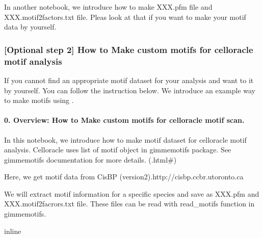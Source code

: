 \documentclass[letterpaper,10pt,english]{sphinxmanual}
\begin{document}
In another notebook, we introduce how to make XXX.pfm file and XXX.motif2factors.txt file. Pleas look at that if you want to make your motif data by yourself.


\subsubsection{{[}Optional step 2{]} How to Make custom motifs for celloracle motif analysis}
\label{\detokenize{tutorials/motifscan:optional-step-2-how-to-make-custom-motifs-for-celloracle-motif-analysis}}
If you cannot find an appropriate motif dataset for your analysis and want to it by yourself. You can follow the instruction below.
We introduce an example way to make motifs using  .


\paragraph{0. Overview: How to Make custom motifs for celloracle motif scan.}
\label{\detokenize{notebooks/02_motif_scan/motif_data_preparation/02_How_to_prepare_custom_motif_data:0.-Overview:-How-to-Make-custom-motifs-for-celloracle-motif-scan.}}\label{\detokenize{notebooks/02_motif_scan/motif_data_preparation/02_How_to_prepare_custom_motif_data::doc}}
In this notebook, we introduce how to make motif dataset for celloracle motif analysis. Celloracle uses list of motif object in gimmemotifs package. See gimmemotifs documentation for more details. (.html\#)

Here, we get motif data from CisBP (version2).http://cisbp.ccbr.utoronto.ca

We will extract motif information for a specific species and save as XXX.pfm and XXX.motif2facrors.txt file. These files can be read with read\_motifs function in gimmemotifs.

{
\begin{sphinxVerbatim}[commandchars=\\\{\}]
\llap{\color{nbsphinxin}[1]:\,\hspace{\fboxrule}\hspace{\fboxsep}}
   
   
   
  

   
 inline
\PYG{p}{[}\PYG{p}{]}  \PYG{p}{[}\PYG{p}{]}

   
\end{sphinxVerbatim}
}
\end{document}
